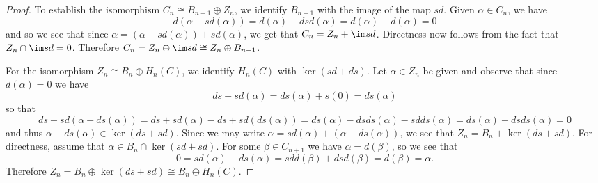 \documentclass[10pt]{amsart}
\begin{document}
\begin{lem}
\begin{proof}
    To establish the isomorphism $C_n \cong B_{n-1} \oplus Z_n$, we identify $B_{n-1}$ with the image of the map $sd$.
    Given $\alpha \in C_n$, we have
    $$d(\alpha - sd(\alpha)) = d(\alpha) - dsd(\alpha) = d(\alpha) - d(\alpha) = 0$$
    and so we see that since $\alpha = (\alpha - sd(\alpha)) + sd(\alpha)$, we get that $C_n = Z_n + \im sd$.
    Directness now follows from the fact that $Z_n \cap \im sd = 0$.
    Therefore $C_n = Z_n \oplus \im sd \cong Z_n \oplus B_{n-1}$.

    For the isomorphism $Z_n \cong B_n \oplus H_n(C)$, we identify $H_n(C)$ with $\ker (sd + ds)$.
    Let $\alpha \in Z_n$ be given and observe that since $d(\alpha) = 0$ we have
    $$ds + sd(\alpha) = ds(\alpha) + s(0) = ds(\alpha)$$
    so that 
    $$ds + sd(\alpha - ds(\alpha)) = ds + sd(\alpha) - ds + sd(ds(\alpha)) = ds(\alpha) - dsds(\alpha) - sdds(\alpha) = ds(\alpha) - dsds(\alpha) = 0$$
    and thus $\alpha - ds(\alpha) \in \ker (ds + sd)$.
    Since we may write $\alpha = sd(\alpha) + (\alpha - ds(\alpha))$, we see that $Z_n = B_n + \ker (ds + sd)$.
    For directness, assume that $\alpha \in B_n \cap \ker (sd + sd)$.
    For some $\beta \in C_{n+1}$ we have $\alpha = d(\beta)$, so we see that
    $$0 = sd(\alpha) + ds(\alpha) = sdd(\beta) + dsd(\beta) = d(\beta) = \alpha.$$
    Therefore $Z_n = B_n \oplus \ker (ds + sd) \cong B_n \oplus H_n(C)$.
  \end{proof}
\end{lem}
\end{document}
